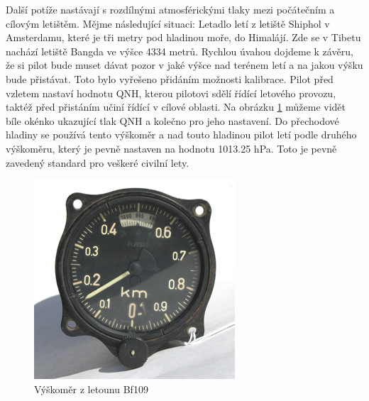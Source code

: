 		Další potíže nastávají s rozdílnými atmosférickými tlaky mezi počátečním a cílovým letištěm. Mějme následující situaci: Letadlo letí z letiště Shiphol v Amsterdamu, které je tři metry pod hladinou moře, do Himalájí. Zde se v Tibetu nachází letiště Bangda ve výšce 4334 metrů\cite{bangda}. Rychlou úvahou dojdeme k závěru, že  si pilot bude muset dávat pozor v jaké výšce nad terénem letí a na jakou výšku bude přistávat. Toto bylo vyřešeno přidáním možnosti kalibrace. Pilot před vzletem nastaví hodnotu QNH, kterou pilotovi sdělí řídící letového provozu, taktéž před přistáním učiní řídící v cílové oblasti. Na obrázku \ref{historie::vyvojMereniVysky::109Altimeter} můžeme vidět bíle okénko ukazující tlak QNH a kolečno pro jeho nastavení. Do přechodové hladiny se používá tento výškoměr a nad touto hladinou pilot letí podle druhého výškoměru, který je pevně nastaven na hodnotu 1013.25 hPa. Toto je pevně zavedený standard pro veškeré civilní lety. 
		
		\begin{figure}[H]
			\begin{center}
				\includegraphics[scale=0.75]{obrazky-figures/109Altimeter.jpg}
				\caption{Výškoměr z letounu Bf109\protect\footnotemark}\label{historie::vyvojMereniVysky::109Altimeter}
			\end{center}
		\end{figure}
		
	
	
